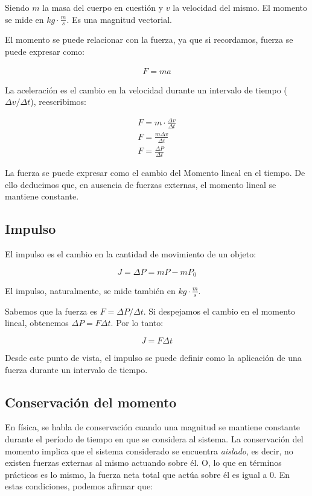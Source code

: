\documentclass[12pt]{article}
\begin{document}
Siendo \(m\) la masa del cuerpo en cuestión y \(v\) la velocidad del mismo.
El momento se mide en \(kg\cdot\frac{m}{s}\). Es una magnitud vectorial.

El momento se puede relacionar con la fuerza, ya que si recordamos,
fuerza se puede expresar como:

\begin{align*}
	F = ma
\end{align*}

La aceleración es el cambio en la velocidad durante un intervalo de tiempo (\(\Delta v / \Delta t\)), reescribimos:

\begin{align*}
	F = m\cdot\frac{\Delta v}{\Delta t} \\
	F = \frac{m \Delta v}{\Delta t}     \\
	F = \frac{\Delta P}{\Delta t}
\end{align*}

La fuerza se puede expresar como el cambio del Momento lineal en el
tiempo.
De ello deducimos que, en ausencia de fuerzas externas,
el momento lineal se mantiene constante.

\subsection{Impulso}


El impulso es el cambio en la cantidad de movimiento de un objeto:

\begin{equation}
	J = \Delta P = mP - mP_{0}
\end{equation}

El impulso, naturalmente, se mide también en \(kg\cdot\frac{m}{s}\).

Sabemos que la fuerza es \(F = \Delta P / \Delta t\).
Si despejamos el cambio en el momento lineal,
obtenemos \(\Delta P = F \Delta t\).
Por lo tanto:

\begin{equation}
	J = F \Delta t
\end{equation}

Desde este punto de vista,
el impulso se puede definir como la aplicación de una fuerza durante un intervalo de tiempo.

\subsection{Conservación del momento}

En física,
se habla de conservación cuando una magnitud se mantiene constante durante
el período de tiempo en que se considera al sistema.
La conservación del momento implica que el sistema considerado
se encuentra \textit{aislado},
es decir,
no existen fuerzas externas al mismo actuando sobre él.
O, lo que en términos prácticos es lo mismo,
la fuerza neta total que actúa sobre él es igual a 0.
En estas condiciones, podemos afirmar que:
\end{document}
